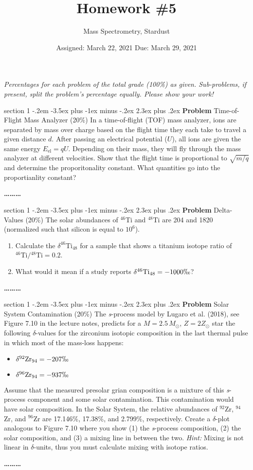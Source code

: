 \documentclass[letterpaper,12pt,twoside=false,DIV=11]{scrartcl}
\makeatletter
\newcommand{\topic}{\author}
\newenvironment{problem}{\@startsection
    {section}
    {1}
    {-.2em}
    {-3.5ex plus -1ex minus -.2ex}
    {2.3ex plus .2ex}
    {
        \pagebreak[3] %
        \noindent\sffamily\bfseries Problem
    }
}
{
    \begin{center}\large\bfseries\ldots\ldots\ldots\end{center}
}
\providecommand{\ex}[1]{\ensuremath{^{#1}}}
\makeatother
\begin{document}
\title{Homework \#5}
\topic{Mass Spectrometry, Stardust}
\date{Assigned: March 22, 2021 \qquad Due: March 29, 2021}

\maketitle
\thispagestyle{fancy}

\noindent\emph{Percentages for each problem of the total grade (100\%) as given. Sub-problems, if present, split the problem's percentage equally. Please show your work!}

\begin{problem}{Time-of-Flight Mass Analyzer (20\%)}
In a time-of-flight (TOF) mass analyzer, ions are separated by mass over charge based on the flight time they each take to travel a given distance $d$. After passing an electrical potential ($U$), all ions are given the same energy $E_\mathrm{el} = qU$. Depending on their mass, they will fly through the mass analyzer at different velocities. Show that the flight time is proportional to $\sqrt{m/q}$ and determine the proporitonality constant. What quantities go into the proportianlity constant?
\end{problem}

\begin{problem}{Delta-Values (20\%)}
The solar abundances of \ex{46}Ti and \ex{48}Ti are 204 and 1820 (normalized such that silicon is equal to $10^6$).
\begin{enumerate}
    \item Calculate the $\delta^{46}\mathrm{Ti}_{48}$ for a sample that shows a titanium isotope ratio of $^{46}\mathrm{Ti}/{^{48}}\mathrm{Ti} = 0.2$.
    \item What would it mean if a study reports $\delta^{46}\mathrm{Ti}_{48} = -1000 \permil$?
\end{enumerate}
\end{problem}

\begin{problem}{Solar System Contamination (20\%)}
The \textit{s}-process model by Lugaro et al. (2018), see Figure 7.10 in the lecture notes, predicts for a $M=2.5\,M_\odot$, $Z=2Z_\odot$ star the following $\delta$-values for the zirconium isotopic composition in the last thermal pulse in which most of the mass-loss happens:
\begin{itemize}
    \item $\delta^{92}\mathrm{Zr}_{94} = -207\permil$
    \item $\delta^{96}\mathrm{Zr}_{94} = -937\permil$
\end{itemize}
Assume that the measured presolar grian composition is a mixture of this \textit{s}-process component and some solar contamination. This contamination would have solar composition. In the Solar System, the relative abundances of \ex{92}Zr, \ex{94}Zr, and \ex{96}Zr are 17.146\%, 17.38\%, and 2.799\%, respectively. Create a $\delta$-plot analogous to Figure 7.10 where you show (1) the \textit{s}-process composition, (2) the solar composition, and (3) a mixing line in between the two. \emph{Hint:} Mixing is not linear in $\delta$-units, thus you must calculate mixing with isotope ratios.
\end{problem}
\end{document}
